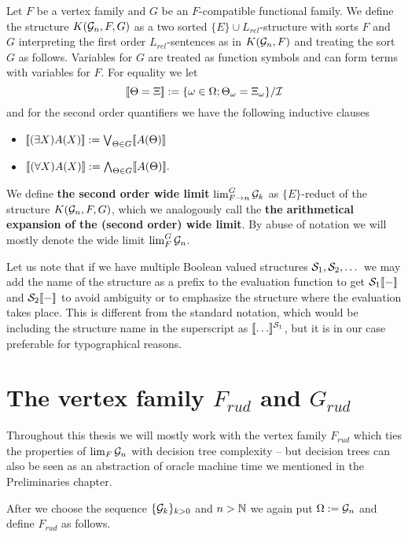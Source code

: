 \begin{defi}
Let $F$ be a vertex family and $G$ be an $F$-compatible functional family. We define the structure $K(\G_n,F,G)$ as a two sorted $\{E\}\cup L_{rel}$-structure with sorts $F$ and $G$ interpreting the first order $L_{rel}$-sentences as in $K(\G_n,F)$ and treating the sort $G$ as follows. Variables for $G$ are treated as function symbols and can form terms with variables for $F$. For equality we let
\[\bbl\Theta=\Xi \bbr := \{\omega\in \Omega;\Theta_\omega=\Xi_\omega\}/\I\]
and for the second order quantifiers we have the following inductive clauses
\begin{itemize}
\item $\bbl(\exists X)A(X)\bbr:=\Lor_{\Theta\in G}\bbl A(\Theta)\bbr$
\item $\bbl(\forall X)A(X)\bbr:=\Land_{\Theta\in G}\bbl A(\Theta)\bbr.$
\end{itemize}

We define \textbf{the second order wide limit} $\lim_{F\to n}^G \G_k$ as $\{E\}$-reduct of the structure $K(\G_n,F,G)$, which we analogously call the \textbf{the arithmetical expansion of the (second order) wide limit}. By abuse of notation we will mostly denote the wide limit $\lim_F^G\G_n$.
\end{defi}

Let us note that if we have multiple Boolean valued structures $\S_1,\S_2,\dots$ we may add the name of the structure as a prefix to the evaluation function to get $\S_1\bbl-\bbr$ and $\S_2\bbl-\bbr$ to avoid ambiguity or to emphasize the structure where the evaluation takes place. This is different from the standard notation, which would be including the structure name in the superscript as $\bbl\dots\bbr^{\S_1}$, but it is in our case preferable for typographical reasons.
 
\section{The vertex family $F_{rud}$ and $G_{rud}$}\label{secFrud}

Throughout this thesis we will mostly work with the vertex family $F_{rud}$ which ties the properties of $\lim_F \G_n$ with decision tree complexity -- but decision trees can also be seen as an abstraction of oracle machine time we mentioned in the Preliminaries chapter.

After we choose the sequence $\{\G_k\}_{k>0}$ and $n>\N$ we again put $\Omega:=\G_n$ and define $F_{rud}$ as follows.

